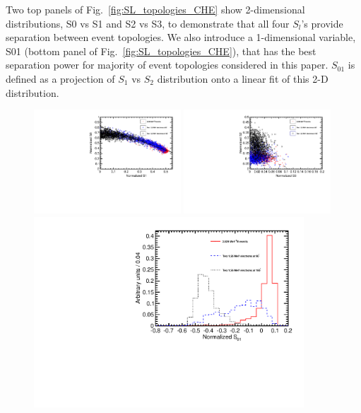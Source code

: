 Two top panels of Fig.~\ref{fig:SL_topologies_CHE} show 2-dimensional
distributions, S0 vs S1 and S2 vs S3, to demonstrate that all four
$S_l$'s provide separation between event topologies.  We also
introduce a 1-dimensional variable, S01 (bottom panel of
Fig.~\ref{fig:SL_topologies_CHE}), that has the best separation power
for majority of event topologies considered in this paper. $S_{01}$ is
defined as a projection of $S_1$ vs $S_2$ distribution onto a linear
fit of this 2-D distribution.

\begin{figure}[h]
  \centering
  \includegraphics[width=0.49\textwidth]{plots/ALL/hS0vsS1_topologies_CHELight_VtxSmear0cm_VtxShiftX0cm_33p5ns_center.pdf}
  \includegraphics[width=0.49\textwidth]{plots/ALL/hS2vsS3_topologies_CHELight_VtxSmear0cm_VtxShiftX0cm_33p5ns_center.pdf}
  \includegraphics[width=0.9\textwidth]{plots/ALL/hS01_topologies_CHELight_VtxSmear0cm_VtxShiftX0cm_33p5ns_center.pdf}

\end{figure}
